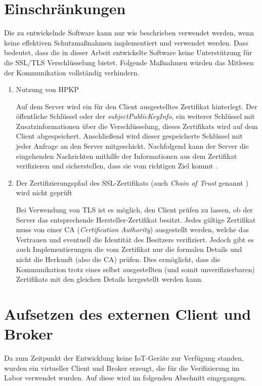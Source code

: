 \section{Einschränkungen}
Die zu entwickelnde Software kann nur wie beschrieben verwendet werden, wenn keine effektiven Schutzmaßnahmen implementiert und verwendet werden. Dass bedeutet, dass die in dieser Arbeit entwickelte Software keine Unterstützung für die SSL/TLS Verschlüsselung bietet.
Folgende Maßnahmen würden das Mitlesen der Kommunikation vollständig verhindern.
\begin{enumerate}
    \item Nutzung von \ac{HPKP}
    
    Auf dem Server wird ein für den Client ausgestelltes Zertifikat hinterlegt. Der öffentliche Schlüssel oder der \emph{subjectPublicKeyInfo}, ein weiterer Schlüssel mit Zusatzinformationen über die Verschlüsselung, dieses Zertifikats wird auf dem Client abgespeichert. Anschließend wird dieser gespeicherte Schlüssel mit jeder Anfrage an den Server mitgeschickt. Nachfolgend kann der Server die eingehenden Nachrichten mithilfe der Informationen aus dem Zertifikat verifizieren und sicherstellen, dass sie vom richtigen Ziel kommt \cite{evans_palmer_sleevi_2015}.
    
    \item Der Zertifizierungspfad des SSL-Zertifikats (auch \emph{Chain of Trust} genannt \cite{georgiev2012most}) wird nicht geprüft
    
    Bei Verwendung von TLS ist es möglich, den Client prüfen zu lassen, ob der Server das entsprechende Hersteller-Zertifikat besitzt. Jedes gültige Zertifikat muss von einer \ac{CA} (\emph{Certification Authority}) ausgestellt werden, welche das Vertrauen und eventuell die Identität des Besitzers verifiziert. Jedoch gibt es auch Implementierungen die vom Zertifikat nur die formalen Details und nicht die Herkunft (also die \ac{CA}) prüfen.
    Dies ermöglicht, dass die Kommunikation trotz eines selbst ausgestellten (und somit unverifizierbaren) Zertifikats mit den gleichen Details hergestellt werden kann.
\end{enumerate}


\section{Aufsetzen des externen Client und Broker}
    Da zum Zeitpunkt der Entwicklung keine \ac{IoT}-Geräte zur Verfügung standen, wurden ein virtueller Client und Broker erzeugt, die für die Verifizierung im Labor verwendet wurden.
    Auf diese wird im folgenden Abschnitt eingegangen.


